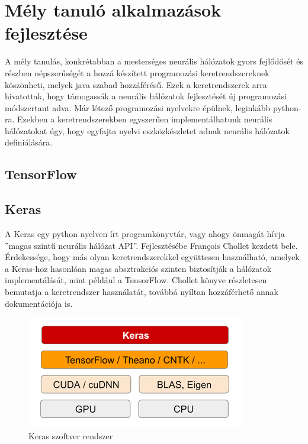 \chapter{Mély tanuló alkalmazások fejlesztése}
A mély tanulás, konkrétabban a mesterséges neurális hálózatok gyors fejlődősét és részben népszerűségét a hozzá készített programozási keretrendszereknek köszönheti, melyek java szabad hozzáférésű. Ezek a keretrendszerek arra hivatottak, hogy támogassák a neurális hálózatok fejlesztését új programozási módszertant adva. Már létező programozási nyelvekre épülnek, leginkább python-ra. Ezekben a keretrendszerekben egyszerűen implementálhatunk neurális hálózatokat úgy, hogy egyfajta nyelvi eszközkészletet adnak neurális hálózatok definiálására.

\section{TensorFlow}

\section{Keras}
A Keras egy python nyelven írt programkönyvtár, vagy ahogy önmagát hívja ''magas szintű neurális hálózat API''\cite{web:Keras}. Fejlesztésébe François Chollet kezdett bele. Érdekessége, hogy más olyan keretrendszerekkel együttesen használható, amelyek a Keras-hoz hasonlóan magas absztrakciós szinten biztosítják a hálózatok implementálását, mint például a TensorFlow.
Chollet könyve részletesen bemutatja a keretrendszer használatát, továbbá nyíltan hozzáférhető annak dokumentációja is.\cite{chollet}\cite{web:Keras}
\begin{figure}[h]
	\centering
	\includegraphics[width=0.5\linewidth]{fig/keras_software_stack}
	\caption{Keras szoftver rendszer\protect\footnotemark}
	\label{fig:kerassoftwarestack}
\end{figure}

